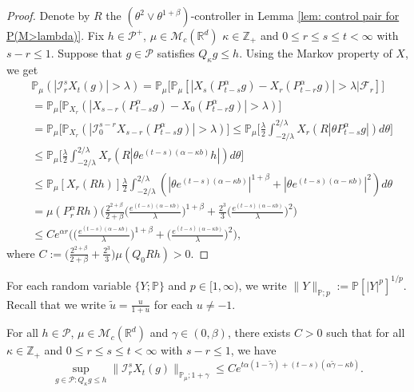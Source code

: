 \documentclass[EJP]{ejpecp} %
\begin{document}
\begin{proof}
	Denote by $R$ the $(\theta^2\vee\theta^{1+\beta})$-controller in Lemma \ref{lem: control pair for P(M>lambda)}.
	Fix $h \in \mathcal P^+$, $\mu \in \mathcal M_c(\mathbb R^d)$ $\kappa \in \mathbb Z_+ $ and $0\leq r\leq s\leq t < \infty$ with $s-r \leq 1$.
	Suppose that $g\in \mathcal P$ satisfies $Q_\kappa g \leq h$.
	Using the Markov property of $X$, we get
\begin{align}
	& \mathbb P_{\mu}(|\mathcal I_r^sX_t(g)|>\lambda)
    = \mathbb P_\mu \Big[\mathbb P_\mu [| X_{s}(P_{t-s}^\alpha g) -  X_{r}(P_{t-r}^\alpha g)|> \lambda | \mathscr F_r ]\Big] \\
    & = \mathbb P_\mu \big[\mathbb P_{X_r}(| X_{s-r}(P_{t-s}^\alpha g) -  X_{0}(P_{t-r}^\alpha g)|> \lambda)\big] \\
    & = \mathbb P_\mu \big[\mathbb P_{X_r}(|\mathcal I_0^{s-r} X_{s-r}( P_{t-s}^\alpha g) |> \lambda)\big]
    \leq \mathbb P_\mu \Big[ \frac{\lambda}{2}\int_{-2/\lambda}^{2/\lambda}X_r(R|\theta P^\alpha_{t-s}g|) d\theta \Big] \\
    & \leq \mathbb P_\mu \Big[ \frac{\lambda}{2}\int_{-2/\lambda}^{2/\lambda}X_r(R|\theta e^{(t-s)(\alpha- \kappa b)}h|) d\theta \Big] \\
    & \leq \mathbb P_\mu [X_r(Rh) ] \frac{\lambda}{2}\int_{-2/\lambda}^{2/\lambda}(|\theta e^{(t-s)(\alpha- \kappa b)}|^{1+\beta} + |\theta e^{(t-s)(\alpha- \kappa b)}|^{2})d\theta
    \\ & =  \mu(P_r^\alpha Rh) \Big(  \frac{2^{2+\beta}}{2+\beta}\Big(\frac{e^{(t-s)(\alpha- \kappa b)}}{\lambda}\Big)^{1+\beta} + \frac{2^{3}}{3}\Big(\frac{e^{(t-s)(\alpha- \kappa b)}}{\lambda}\Big)^2\Big)
    \\ & \leq C e^{\alpha r} \Big(\Big( \frac{e^{(t-s)(\alpha - \kappa b)}}{\lambda}\Big)^{1+\beta} + \Big( \frac{e^{(t-s)(\alpha - \kappa b)}}{\lambda}\Big)^{2} \Big),
\end{align}
	where $C := \Big(\frac{2^{2+\beta}}{2+\beta} + \frac{2^{3}}{3} \Big) \mu(Q_0Rh)>0$.
\end{proof}

	For each random variable $\{Y; \mathbb P\}$ and $p \in [1,\infty)$, we write $ \|Y\|_{\mathbb P;p} := \mathbb P[|Y|^p]^{1/p}$.
	Recall that we write $\tilde u = \frac{u}{1+u}$ for each $u\neq -1$.

\begin{lemma}
	\label{lem: control of mgtrs}
	For all $h \in \mathcal P$, $\mu \in \mathcal M_c(\mathbb R^d)$ and $\gamma\in (0, \beta)$, there exists $C > 0$ such that for all $\kappa \in \mathbb Z_+$ and $0\leq r \leq s\leq t<\infty$ with $s-r \leq 1$, we have
\[
    \sup_{g \in \mathcal P: Q_\kappa g \leq h} \|\mathcal I_r^s X_t(g) \|_{\mathbb P_\mu;1+\gamma}
    \leq C e^{t\alpha (1- \tilde \gamma)+(t-s) (\alpha \tilde \gamma - \kappa b)}.
\]
\end{lemma}
\end{document}
